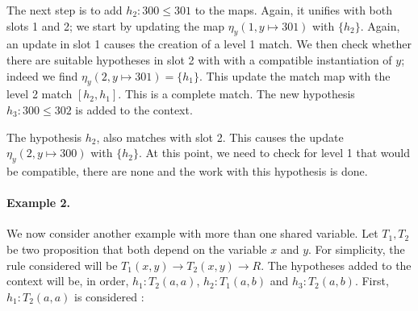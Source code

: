 \documentclass[runningheads]{llncs}
\begin{document}
The next step is to add $h_2 : 300 \leq 301$ to the maps.
Again, it unifies with both slots 1 and 2; we start by updating the map $\eta_y(1, y \mapsto 301)$ with $\{h_2\}$.
Again, an update in slot 1 causes the creation of a level 1 match.
We then check whether there are suitable hypotheses in slot 2 with
with a compatible instantiation of $y$; indeed we find $\eta_y(2, y \mapsto 301) = \{h_1\}$.
This update the match map with the level 2 match $[h_2,h_1]$.
This is a complete match.
The new hypothesis $h_3 : 300 \leq 302$ is added to the context.

The hypothesis $h_2$, also matches with slot 2.
This causes the update $\eta_y(2, y \mapsto 300)$ with $\{h_2\}$. 
At this point, we need to check for level 1 that would be compatible, there are none and the work with this hypothesis is done.

\begin{center}
    \end{center}

\paragraph{Example 2.}
We now consider another example with more than one shared variable.
Let $T_1, T_2$ be two proposition that both depend on the variable $x$ and $y$.
For simplicity, the rule considered will be $T_1(x,y) \to T_2(x,y) \to R$.
The hypotheses added to the context will be, in order, $h_1 : T_2(a,a)$, $h_2 : T_1(a,b)$ and $h_3 : T_2(a,b)$.
First, $h_1 : T_2(a,a)$ is considered :
\end{document}
